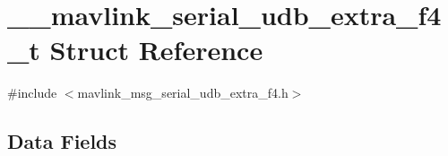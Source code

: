 \hypertarget{struct____mavlink__serial__udb__extra__f4__t}{\section{\+\_\+\+\_\+mavlink\+\_\+serial\+\_\+udb\+\_\+extra\+\_\+f4\+\_\+t Struct Reference}
\label{struct____mavlink__serial__udb__extra__f4__t}
}


{\ttfamily \#include $<$mavlink\+\_\+msg\+\_\+serial\+\_\+udb\+\_\+extra\+\_\+f4.\+h$>$}

\subsection*{Data Fields}
